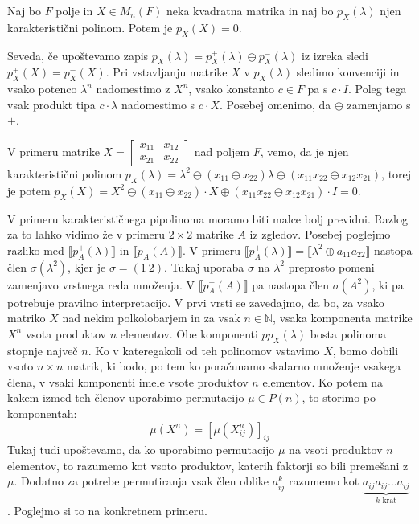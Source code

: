 \documentclass[mat1]{fmfdelo}
\newcommand{\N}{\mathbb{N}}
\begin{document}
\begin{izrek}
	Naj bo $F$ polje in $X\in M_n(F)$ neka kvadratna matrika in naj bo $p_X(\lambda)$ njen karakteristični polinom. Potem je $p_X(X) = 0$.
\end{izrek}

Seveda, če upoštevamo zapis $p_X(\lambda) = p_X^{+}(\lambda) \ominus p_X^{-}(\lambda)$ iz izreka sledi $p_X^{+}(X) = p_X^{-}(X)$. Pri vstavljanju matrike $X$ v $p_X(\lambda)$ sledimo konvenciji in vsako potenco $\lambda^n$ nadomestimo z $X^n$, vsako konstanto $c\in F$ pa s $c\cdot I$. Poleg tega vsak produkt tipa $c\cdot \lambda$ nadomestimo s $c\cdot X$. Posebej omenimo, da $\oplus$ zamenjamo s $+$.

V primeru matrike $X = \begin{bmatrix}
	x_{11} & x_{12} \\
	x_{21} & x_{22}
\end{bmatrix}$ nad poljem $F$, vemo, da je njen karakteristični polinom $p_X(\lambda) = \lambda^2 \ominus (x_{11} \oplus x_{22})\lambda \oplus (x_{11}x_{22} \ominus x_{12}x_{21})$, torej je potem $p_X(X) = X^2 \ominus (x_{11} \oplus x_{22})\cdot X \oplus (x_{11}x_{22} \ominus x_{12}x_{21})\cdot I = 0$. 

V primeru karakterističnega pipolinoma moramo biti malce bolj previdni. Razlog za to lahko vidimo že v primeru $2\times 2$ matrike $A$ iz zgledov. Posebej poglejmo razliko med $\llbracket p_A^{+}(\lambda)\rrbracket$ in $\llbracket p_A^{+}(A)\rrbracket$. V primeru $\llbracket p_A^{+}(\lambda) \rrbracket = \llbracket \lambda^2 \oplus a_{11}a_{22}\rrbracket$ nastopa člen $\sigma(\lambda^2)$, kjer je $\sigma = (1~2)$. Tukaj uporaba $\sigma$ na $\lambda^2$ preprosto pomeni zamenjavo vrstnega reda množenja. V $\llbracket p_A^{+}(A)\rrbracket$ pa nastopa člen $\sigma(A^2)$, ki pa potrebuje pravilno interpretacijo. V prvi vrsti se zavedajmo, da bo, za vsako matriko $X$ nad nekim polkolobarjem in za vsak $n\in\N$, vsaka komponenta matrike $X^n$ vsota produktov $n$ elementov. Obe komponenti $pp_X(\lambda)$ bosta polinoma stopnje največ $n$. Ko v kateregakoli od teh polinomov vstavimo $X$, bomo dobili vsoto $n\times n$ matrik, ki bodo, po tem ko poračunamo skalarno množenje vsakega člena, v vsaki komponenti imele vsote produktov $n$ elementov. Ko potem na kakem izmed teh členov uporabimo permutacijo $\mu\in P(n)$, to storimo po komponentah: $$\mu(X^n) = \left[\mu(X^n_{ij})\right]_{ij}$$ Tukaj tudi upoštevamo, da ko uporabimo permutacijo $\mu$ na vsoti produktov $n$ elementov, to razumemo kot vsoto produktov, katerih faktorji so bili premešani z $\mu$. Dodatno za potrebe permutiranja vsak člen oblike $a_{ij}^k$ razumemo kot $\underbrace{a_{ij}a_{ij}\ldots a_{ij}}_{\text{$k$-krat}}$. Poglejmo si to na konkretnem primeru.
\end{document}
